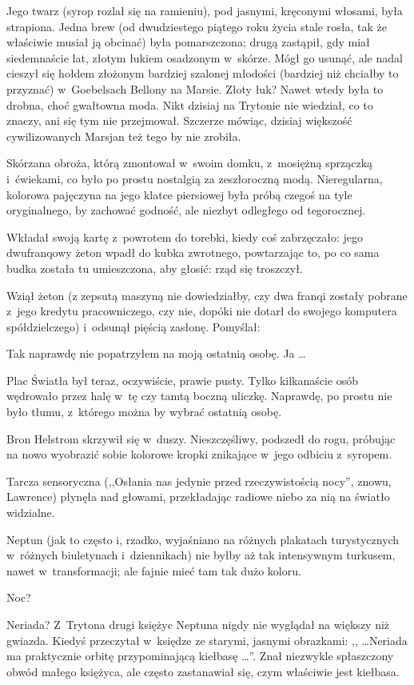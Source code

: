 \documentclass[oneside,polish,11pt,rmheadings]{mwbk}
\begin{document}
Jego twarz (syrop rozlał się na ramieniu), pod jasnymi, kręconymi włosami, była strapiona. Jedna brew (od dwudziestego piątego roku życia stale rosła, tak że właściwie musiał ją obcinać) była pomarszczona; drugą zastąpił, gdy miał siedemnaście lat, złotym łukiem osadzonym w~skórze. Mógł go usunąć, ale nadal cieszył się hołdem złożonym bardziej szalonej młodości (bardziej niż chciałby to przyznać) w~Goebelsach Bellony na Marsie. Złoty łuk? Nawet wtedy była to drobna, choć gwałtowna moda. Nikt dzisiaj na Trytonie nie wiedział, co to znaczy, ani się tym nie przejmował. Szczerze mówiąc, dzisiaj większość cywilizowanych Marsjan też tego by nie zrobiła. 

Skórzana obroża, którą zmontował w~swoim domku, z~mosiężną sprzączką i~ćwiekami, co było po prostu nostalgią za zeszłoroczną modą. Nieregularna, kolorowa pajęczyna na jego klatce piersiowej była próbą czegoś na tyle oryginalnego, by zachować godność, ale niezbyt odległego od tegorocznej. 

Wkładał swoją kartę z~powrotem do torebki, kiedy coś zabrzęczało: jego dwufranqowy żeton wpadł do kubka zwrotnego, powtarzając to, po co sama budka została tu umieszczona, aby głosić: rząd się troszczył. 

Wziął żeton (z zepsutą maszyną nie dowiedziałby, czy dwa franqi zostały pobrane z~jego kredytu pracowniczego, czy nie, dopóki nie dotarł do swojego komputera spółdzielczego) i~odsunął pięścią zasłonę. Pomyślał: 

Tak naprawdę nie popatrzyłem na moją ostatnią osobę. Ja \ldots  

Plac Światła był teraz, oczywiście, prawie pusty. Tylko kilkanaście osób wędrowało przez halę w~tę czy tamtą boczną uliczkę. Naprawdę, po prostu nie było tłumu, z~którego można by wybrać ostatnią osobę. 

Bron Helstrom skrzywił się w~duszy. Nieszczęśliwy, podszedł do rogu, próbując na nowo wyobrazić sobie kolorowe kropki znikające w~jego odbiciu z~syropem. 

Tarcza sensoryczna (,,Osłania nas jedynie przed rzeczywistością nocy'', znowu, Lawrence) płynęła nad głowami, przekładając radiowe niebo za nią na światło widzialne. 

Neptun (jak to często i, rzadko, wyjaśniano na różnych plakatach turystycznych w~różnych biuletynach i~dziennikach) nie byłby aż tak intensywnym turkusem, nawet w~transformacji; ale fajnie mieć tam tak dużo koloru. 

Noc? 

Neriada? Z~Trytona drugi księżyc Neptuna nigdy nie wyglądał na większy niż gwiazda. Kiedyś przeczytał w~księdze ze starymi, jasnymi obrazkami:  ,, \ldots Neriada ma praktycznie orbitę przypominającą kiełbasę \ldots ''. Znał niezwykle spłaszczony obwód małego księżyca, ale często zastanawiał się, czym właściwie jest kiełbasa. 
\end{document}
